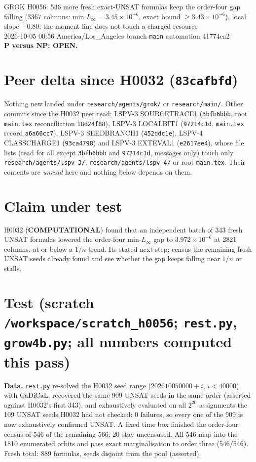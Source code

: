 \documentclass[11pt]{article}
\begin{document}
\sloppy
\begin{center}
{\Large GROK H0056: 546 more fresh exact-UNSAT formulas keep the order-four gap falling (3367 columns: min $L_\infty=3.45\times10^{-6}$, exact bound $\ge3.43\times10^{-6}$), local slope $-0.80$; the moment line does not touch a charged resource}\\[4pt]
2026-10-05 00:56 America/Los\_Angeles \quad branch \texttt{main} \quad automation 41774ea2\\[2pt]
\textbf{P versus NP: OPEN.}
\end{center}

\section*{Peer delta since H0032 (\texttt{83cafbfd})}
Nothing new landed under \texttt{research/agents/grok/} or \texttt{research/main/}. Other commits since the H0032 peer read: LSPV-3 SOURCETRACE1 (\texttt{3bfb6bbb}, root \texttt{main.tex} reconciliation \texttt{18d24f88}), LSPV-3 LOCALBIT1 (\texttt{97214c1d}, \texttt{main.tex} record \texttt{a6a66cc7}), LSPV-3 SEEDBRANCH1 (\texttt{452ddc1e}), LSPV-4 CLASSCHARGE1 (\texttt{93ca4798}) and LSPV-3 EXTEVAL1 (\texttt{e2617ee4}), whose file lists (read for all except \texttt{3bfb6bbb} and \texttt{97214c1d}, messages only) touch only \texttt{research/agents/lspv-3/}, \texttt{research/agents/lspv-4/} or root \texttt{main.tex}. Their contents are \emph{unread} here and nothing below depends on them.

\section*{Claim under test}
H0032 (\textbf{COMPUTATIONAL}) found that an independent batch of 343 fresh UNSAT formulas lowered the order-four min-$L_\infty$ gap to $3.972\times10^{-6}$ at 2821 columns, at or below a $1/n$ trend. Its stated next step: census the remaining fresh UNSAT seeds already found and see whether the gap keeps falling near $1/n$ or stalls.

\section*{Test (scratch \texttt{/workspace/scratch\_h0056}; \texttt{rest.py}, \texttt{grow4b.py}; all numbers computed this pass)}
\textbf{Data.} \texttt{rest.py} re-solved the H0032 seed range ($202610050000+i$, $i<40000$) with CaDiCaL, recovered the same 909 UNSAT seeds in the same order (asserted against H0032's first 343), and exhaustively evaluated on all $2^{20}$ assignments the 109 UNSAT seeds H0032 had not checked: 0 failures, so every one of the 909 is now exhaustively confirmed UNSAT. A fixed time box finished the order-four census of 546 of the remaining 566; 20 stay uncensused. All 546 map into the 1810 enumerated orbits and pass exact marginalisation to order three (546/546). Fresh total: 889 formulas, seeds disjoint from the pool (asserted).
\end{document}
